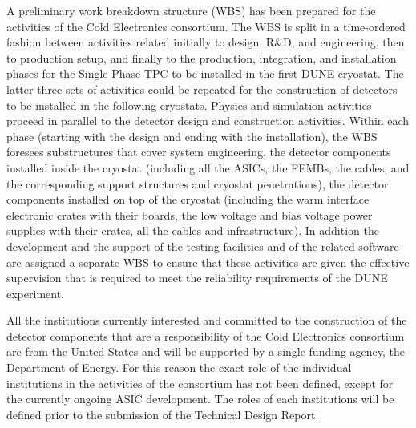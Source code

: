 A preliminary work breakdown structure (WBS) has been prepared for the activities
of the Cold Electronics consortium. The WBS is split in a time-ordered fashion
between activities related initially to design, R\&D, and engineering, then
to production setup, and finally to the production, integration, and installation
phases for the Single Phase TPC to be installed in the first DUNE cryostat. The
latter three sets of activities could be repeated for the construction
of detectors to be installed in the following cryostats. Physics and simulation
activities proceed in parallel to the detector design and construction activities.
Within each phase (starting with the design and ending with the installation),
the WBS foresees substructures that cover system engineering, the detector
components installed inside the cryostat (including all the ASICs, the FEMBs,
the cables, and the corresponding support structures and cryostat penetrations),
the detector components installed on top of the cryostat (including the warm
interface electronic crates with their boards, the low voltage and bias
voltage power supplies with their crates, all the cables and infrastructure).
In addition the development and the support of the testing facilities and of
the related software are assigned a separate WBS to ensure that these activities
are given the effective supervision that is required to meet the reliability
requirements of the DUNE experiment.

All the institutions currently interested and committed to the construction of
the detector components that are a responsibility of the Cold Electronics
consortium are from the United States and will be supported by a single
funding agency, the Department of Energy. For this reason the exact role of
the individual institutions in the activities of the consortium has not been
defined, except for the currently ongoing ASIC development. The roles of
each institutions will be defined prior to the submission of the Technical
Design Report.
